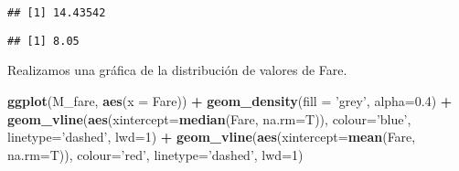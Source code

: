 \documentclass[]{article}
\newenvironment{Shaded}{\begin{snugshade}}{\end{snugshade}}
\newcommand{\KeywordTok}[1]{\textcolor[rgb]{0.13,0.29,0.53}{\textbf{#1}}}
\newcommand{\DataTypeTok}[1]{\textcolor[rgb]{0.13,0.29,0.53}{#1}}
\newcommand{\DecValTok}[1]{\textcolor[rgb]{0.00,0.00,0.81}{#1}}
\newcommand{\FloatTok}[1]{\textcolor[rgb]{0.00,0.00,0.81}{#1}}
\newcommand{\StringTok}[1]{\textcolor[rgb]{0.31,0.60,0.02}{#1}}
\newcommand{\OperatorTok}[1]{\textcolor[rgb]{0.81,0.36,0.00}{\textbf{#1}}}
\newcommand{\NormalTok}[1]{#1}
\begin{document}
\begin{Shaded}
\end{Shaded}

\begin{verbatim}
## [1] 14.43542
\end{verbatim}

\begin{Shaded}
\end{Shaded}

\begin{verbatim}
## [1] 8.05
\end{verbatim}

Realizamos una gráfica de la distribución de valores de Fare.

\begin{Shaded}
\begin{Highlighting}[]
\KeywordTok{ggplot}\NormalTok{(M_fare,  }\KeywordTok{aes}\NormalTok{(}\DataTypeTok{x =}\NormalTok{ Fare)) }\OperatorTok{+}
\StringTok{  }\KeywordTok{geom_density}\NormalTok{(}\DataTypeTok{fill =} \StringTok{'grey'}\NormalTok{, }\DataTypeTok{alpha=}\FloatTok{0.4}\NormalTok{) }\OperatorTok{+}\StringTok{ }
\StringTok{  }\KeywordTok{geom_vline}\NormalTok{(}\KeywordTok{aes}\NormalTok{(}\DataTypeTok{xintercept=}\KeywordTok{median}\NormalTok{(Fare, }\DataTypeTok{na.rm=}\NormalTok{T)),}
    \DataTypeTok{colour=}\StringTok{'blue'}\NormalTok{, }\DataTypeTok{linetype=}\StringTok{'dashed'}\NormalTok{, }\DataTypeTok{lwd=}\DecValTok{1}\NormalTok{) }\OperatorTok{+}
\StringTok{  }\KeywordTok{geom_vline}\NormalTok{(}\KeywordTok{aes}\NormalTok{(}\DataTypeTok{xintercept=}\KeywordTok{mean}\NormalTok{(Fare, }\DataTypeTok{na.rm=}\NormalTok{T)),}
  \DataTypeTok{colour=}\StringTok{'red'}\NormalTok{, }\DataTypeTok{linetype=}\StringTok{'dashed'}\NormalTok{, }\DataTypeTok{lwd=}\DecValTok{1}\NormalTok{)}
\end{Highlighting}
\end{Shaded}
\end{document}
